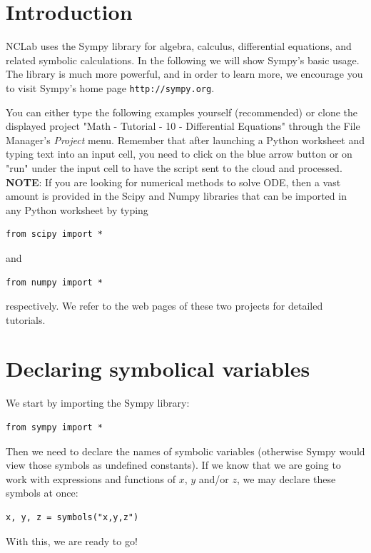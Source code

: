 \documentclass{article}
\begin{document}
\normalsize

\newpage
\setcounter{tocdepth}{2}
\tableofcontents

\newpage

\pagestyle{plain}
\setcounter{page}{1}


\newpage

\pagestyle{plain}


\section{Introduction}

NCLab uses the Sympy library for algebra, calculus, differential equations, and related 
symbolic calculations. In the following we will show Sympy's basic usage. The library 
is much more powerful, and in order to learn more, we encourage you to visit Sympy's
home page {\tt http://sympy.org}. 

You can either type the 
following examples yourself (recommended) or clone the displayed project 
"Math - Tutorial - 10 - Differential Equations" through the File Manager's
{\em Project} menu. Remember that after launching a Python worksheet and 
typing text into an input cell, you need to click on the blue arrow button 
or on "run" under the input cell to have the script sent to the cloud and processed.\\

\noindent
{\bf NOTE}: If you are looking for numerical methods to solve ODE, then
a vast amount is provided in the Scipy and Numpy libraries that can 
be imported in any Python worksheet by typing

\begin{verbatim}
from scipy import *
\end{verbatim}
and

\begin{verbatim}
from numpy import *
\end{verbatim}
respectively. We refer to the web pages of these
two projects for detailed tutorials.

\section{Declaring symbolical variables}

We start by importing the Sympy library:

\begin{verbatim}
from sympy import *
\end{verbatim}
Then we need to declare the names of symbolic variables (otherwise Sympy would 
view those symbols as undefined constants). If we know that we are going to work 
with expressions and functions of $x$, $y$ and/or $z$, we may declare these symbols 
at once:
\begin{verbatim}
x, y, z = symbols("x,y,z")
\end{verbatim}
With this, we are ready to go!
\end{document}

